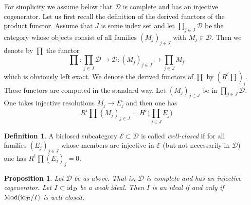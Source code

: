 \documentclass{amsproc}
\def\Dscr{{\mathcal D}}
\def\Escr{{\mathcal E}}
\def\Id{\text{id}}
\def\Mod{\mathop{\text{Mod}}}
\def\r{\rightarrow}
\let\oldtext\text
\def\text#1{\oldtext{\upshape #1}}
\newtheorem{propositions}[lemmas]{Proposition}
\theoremstyle{definition}
\newtheorem{definitions}[lemmas]{Definition}
\theoremstyle{remark}
\numberwithin{equation}{section}
\numberwithin{table}{section}
\numberwithin{figure}{section}
\begin{document}
For simplicity we assume below that $\Dscr$ is complete and has an
injective cogenerator. Let us first recall the definition of the derived
functors of the product functor.  Assume that $J$ is some index
set and let $\prod_{j\in J}\Dscr$ be the category whose objects
consist of all families $(M_j)_{j\in J}$ with $M_j\in \Dscr$.  Then we
denote by $\prod$ the functor
\[
\prod :\prod_{j\in J}\Dscr \r \Dscr:(M_j)_{j\in J}\mapsto \prod_{j\in J}M_j
\]
which is obviously left exact. We denote the derived functors  of $\prod$ by
$(R^i\prod)_i$. These functors are computed in the standard way. Let
$(M_j)_{j\in J}$ be in $\prod_{j\in J}\Dscr$. One takes injective resolutions
$M_j\r E_j^\cdot$ and then one has
\[
R^i\prod (M_j)_{j\in J}=H^i\bigl(\prod_{j\in J} E_j^\cdot\bigr)
\]
\begin{definitions}
A biclosed subcategory $\Escr\subset \Dscr$ is called \emph{well-closed} if for
all families  $(E_j)_{j\in J}$ whose members are injective in $\Escr$ (but not
necessarily in $\Dscr$) one has $R^1\prod (E_j)_j=0$.
\end{definitions}
\begin{propositions}
\label{ref:3.5.7a}
Let $\Dscr$ be as above. That is, $\Dscr$ is complete and has an injective
cogenerator. Let $I\subset \Id_\Dscr$ be a weak ideal. Then $I$ is an ideal if
and only if $\Mod(\Id_\Dscr/I)$ is well-closed.
\end{propositions}
\end{document}
